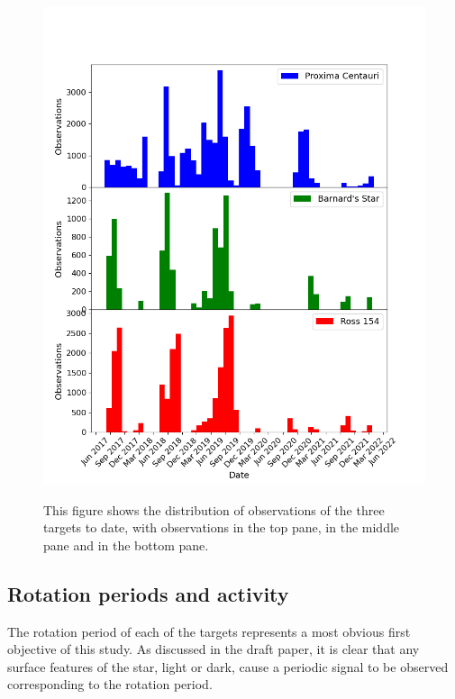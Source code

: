 \begin{figure}[!htbp]
\begin{center}
\includegraphics[scale=0.60]{images/rdwarfhist.png} \\
\end{center}   
\caption{This figure shows the distribution of observations of the three
{\rdwarf} targets to date, with {\prox} observations in the top pane, {\bstar}
in the middle pane and {\ross} in the bottom pane.}
\protect\label{fig:rdwarfhist}
\end{figure}

\subsection{Rotation periods and activity}
\protect\label{section:rotact}

The rotation period of each of the targets represents a most obvious
first objective of this study. As discussed in the draft paper, it is clear that
any surface features of the star, light or dark, cause a periodic signal to be
observed corresponding to the rotation period.

